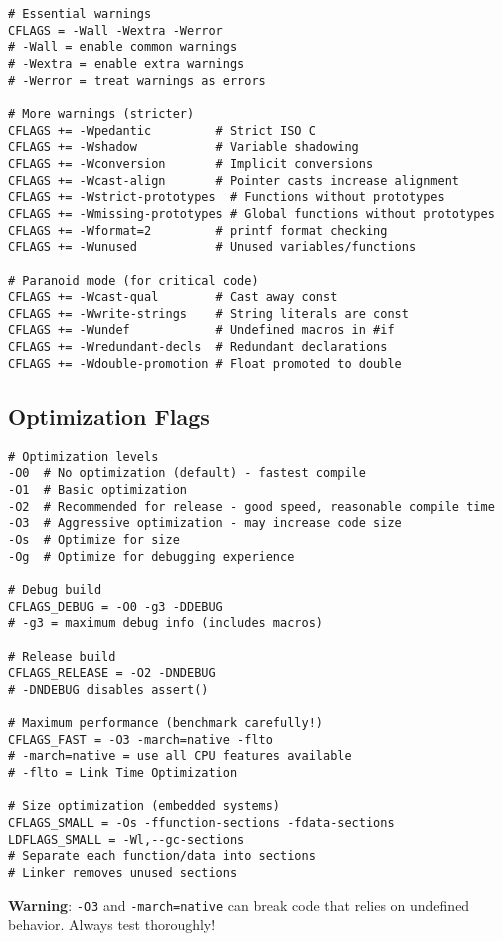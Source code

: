 \begin{lstlisting}
# Essential warnings
CFLAGS = -Wall -Wextra -Werror
# -Wall = enable common warnings
# -Wextra = enable extra warnings
# -Werror = treat warnings as errors

# More warnings (stricter)
CFLAGS += -Wpedantic         # Strict ISO C
CFLAGS += -Wshadow           # Variable shadowing
CFLAGS += -Wconversion       # Implicit conversions
CFLAGS += -Wcast-align       # Pointer casts increase alignment
CFLAGS += -Wstrict-prototypes  # Functions without prototypes
CFLAGS += -Wmissing-prototypes # Global functions without prototypes
CFLAGS += -Wformat=2         # printf format checking
CFLAGS += -Wunused           # Unused variables/functions

# Paranoid mode (for critical code)
CFLAGS += -Wcast-qual        # Cast away const
CFLAGS += -Wwrite-strings    # String literals are const
CFLAGS += -Wundef            # Undefined macros in #if
CFLAGS += -Wredundant-decls  # Redundant declarations
CFLAGS += -Wdouble-promotion # Float promoted to double
\end{lstlisting}

\subsection{Optimization Flags}

\begin{lstlisting}
# Optimization levels
-O0  # No optimization (default) - fastest compile
-O1  # Basic optimization
-O2  # Recommended for release - good speed, reasonable compile time
-O3  # Aggressive optimization - may increase code size
-Os  # Optimize for size
-Og  # Optimize for debugging experience

# Debug build
CFLAGS_DEBUG = -O0 -g3 -DDEBUG
# -g3 = maximum debug info (includes macros)

# Release build
CFLAGS_RELEASE = -O2 -DNDEBUG
# -DNDEBUG disables assert()

# Maximum performance (benchmark carefully!)
CFLAGS_FAST = -O3 -march=native -flto
# -march=native = use all CPU features available
# -flto = Link Time Optimization

# Size optimization (embedded systems)
CFLAGS_SMALL = -Os -ffunction-sections -fdata-sections
LDFLAGS_SMALL = -Wl,--gc-sections
# Separate each function/data into sections
# Linker removes unused sections
\end{lstlisting}

\textbf{Warning}: \texttt{-O3} and \texttt{-march=native} can break code that relies on undefined behavior. Always test thoroughly!

